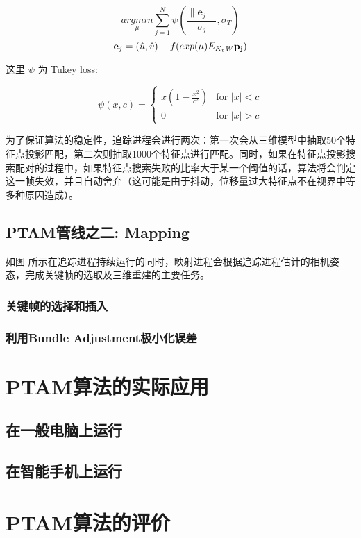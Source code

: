 \begin{equation}
\underset{\mu}{argmin} \sum_{j=1}^{N} \psi( \frac{\lVert\mathbf{e}_j\rVert}{\sigma_j} , \sigma_T)
\end{equation}
\begin{equation}
\mathbf{e}_j= (\hat{u},\hat{v})- f(exp(\mu)E_{K_{t}\mathit{W}} \mathbf{p_j})
\end{equation}

这里 $\psi$ 为 Tukey loss:

\begin{equation}
\psi(x,c)= 
\begin{cases}
x(1-\frac{x^2}{c^2}) & \text{for }|x|<c \\
0  &  \text{for }|x|>c
\end{cases}
\end{equation}

为了保证算法的稳定性，追踪进程会进行两次：第一次会从三维模型中抽取50个特征点投影匹配，第二次则抽取1000个特征点进行匹配。同时，如果在特征点投影搜索配对的过程中，如果特征点搜索失败的比率大于某一个阈值的话，算法将会判定这一帧失效，并且自动舍弃（这可能是由于抖动，位移量过大特征点不在视界中等多种原因造成）。


\subsection{PTAM管线之二: Mapping}

如图 %
所示在追踪进程持续运行的同时，映射进程会根据追踪进程估计的相机姿态，完成关键帧的选取及三维重建的主要任务。

\subsubsection{关键帧的选择和插入}

\subsubsection{利用Bundle Adjustment极小化误差}


\section{PTAM算法的实际应用}
\subsection{在一般电脑上运行}
\subsection{在智能手机上运行}

\section{PTAM算法的评价}
